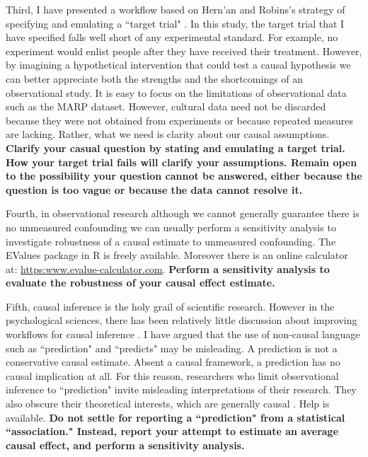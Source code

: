 \documentclass[]{interact}
\theoremstyle{plain}%
\theoremstyle{definition}
\theoremstyle{remark}
\begin{document}
Third, I have presented a workflow based on Hern'{a}n  and Robins's strategy of specifying and emulating a “target trial" \citep{hernan_specifying_2016}. 
In this study, the target trial that I have specified falls well short of any experimental standard. For example, no experiment would enlist people after they have received their treatment. However, by imagining a hypothetical intervention that could test a causal hypothesis we can better appreciate both the strengths and the shortcomings of an observational study. It is easy to focus on the limitations of observational data such as the MARP dataset. However, cultural data need not be discarded because they were not obtained from experiments or because repeated measures are lacking. Rather, what we need is clarity about our causal assumptions. {\bf Clarify your casual question by stating and emulating a target trial. How your target trial fails will clarify your assumptions. Remain open to the possibility your question cannot be answered, either because the question is too vague or because the data cannot resolve it.}

Fourth, in observational research although we cannot generally guarantee there is no unmeasured confounding we can usually perform a sensitivity analysis to investigate robustness of a causal estimate to unmeasured confounding. The EValues package in R is freely available. Moreover there is an online calculator at: \href{https://www.evalue-calculator.com/}{https:\/\/www.evalue-calculator.com\/}. {\bf Perform a sensitivity analysis to evaluate the robustness of your causal effect estimate.}
 
Fifth, causal inference is the holy grail of scientific research. However in the psychological sciences, there has been relatively little discussion about improving workflows for causal inference \citep[although see:][]{rohrer_thinking_2018}. 
I have argued that the use of non-causal language such as “prediction" and “predicts" may be misleading. A prediction is not a conservative causal estimate. Absent a causal framework, a prediction has no causal implication at all. For this reason, researchers who limit observational inference to “prediction" invite misleading interpretations of their research. They also obscure their theoretical interests, which are generally causal \citep{hernan_c-word_2018}. Help is available. {\bf Do not settle for reporting a “prediction" from a statistical ``association." Instead, report your attempt to estimate an average causal effect, and perform a sensitivity analysis.} 
\end{document}
